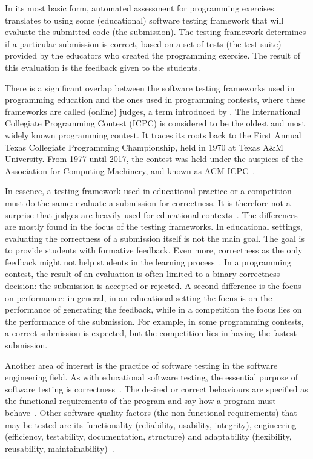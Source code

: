 \documentclass[../main]{subfiles}
\begin{document}
In its most basic form, automated assessment for programming exercises translates to using some (educational) software testing framework that will evaluate the submitted code (the submission).
The testing framework determines if a particular submission is correct, based on a set of tests (the test suite) provided by the educators who created the programming exercise.
The result of this evaluation is the feedback given to the students.

There is a significant overlap between the software testing frameworks used in programming education and the ones used in programming contests, where these frameworks are called (online) judges, a term introduced by \textcite{kurniaOnlineJudge2001}.
The International Collegiate Programming Contest (ICPC) is considered to be the oldest and most widely known programming contest.
It traces its roots back to the First Annual Texas Collegiate Programming Championship, held in 1970 at Texas A\&M University.
From 1977 until 2017, the contest was held under the auspices of the Association for Computing Machinery, and known as ACM-ICPC~\autocite{ICPCFactSheet2023}.

In essence, a testing framework used in educational practice or a competition must do the same: evaluate a submission for correctness.
It is therefore not a surprise that judges are heavily used for educational contexts~\autocite{wasikSurveyOnlineJudge2018,zinovievaUseOnlineCoding2021,liuWhoJudgesJudge2023}.
The differences are mostly found in the focus of the testing frameworks.
In educational settings, evaluating the correctness of a submission itself is not the main goal.
The goal is to provide students with formative feedback.
Even more, correctness as the only feedback might not help students in the learning process~\autocite{haoUnderstandingEffectiveDesign2021}.
In a programming contest, the result of an evaluation is often limited to a binary correctness decision: the submission is accepted or rejected.
A second difference is the focus on performance: in general, in an educational setting the focus is on the performance of generating the feedback, while in a competition the focus lies on the performance of the submission.
For example, in some programming contests, a correct submission is expected, but the competition lies in having the fastest submission.

Another area of interest is the practice of software testing in the software engineering field.
As with educational software testing, the essential purpose of software testing is correctness~\autocite{panSoftwareTesting1999}.
The desired or correct behaviours are specified as the functional requirements of the program and say how a program must behave~\autocite{bassSoftwareArchitecturePractice2021}.
Other software quality factors (the non‐functional requirements) that may be tested are its functionality (reliability, usability, integrity), engineering (efficiency, testability, documentation, structure) and adaptability (flexibility, reusability, maintainability)~\autocite{hetzelCompleteGuideSoftware1988}.
\end{document}
